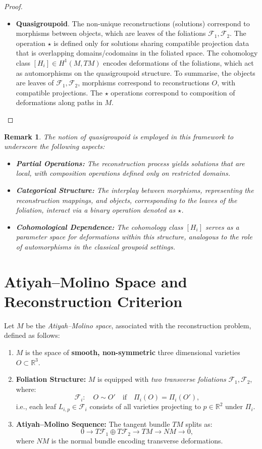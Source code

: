 \documentclass[runningheads]{llncs}
\newtheorem{rem}{Remark}
\newcommand{\cF}{\mathcal{F}}
\begin{document}
\begin{proof}
\begin{itemize}
\begin{itemize}
\item \textbf{Quasigroupoid}.  The non-unique reconstructions (solutions) correspond to morphisms between objects, which are leaves of the foliations $\cF_1, \cF_2$.
The operation $\star$  is defined only for solutions sharing compatible projection data that is overlapping domains/codomains in the foliated space. The cohomology class $[H_i] \in H^1(M, TM)$ encodes deformations of the foliations, which act as automorphisms on the quasigroupoid structure. To summarise, the objects are leaves of $\cF_1, \cF_2$, morphisms correspond to reconstructions $O$, with compatible projections. The $\star$ operations correspond to composition of deformations along paths in $M$.
\end{itemize}
\end{itemize}
\end{proof}
\begin{rem}
The notion of quasigroupoid is  employed in this framework to underscore the following aspects: 
\begin{itemize}
\item {\bf Partial Operations:} The reconstruction process yields solutions that are  local, with composition operations defined only on restricted domains. 
\item {\bf  Categorical Structure:} The interplay between morphisms, representing the reconstruction mappings, and objects, corresponding to the leaves of the foliation, interact via a binary operation denoted as $\star$.
\item {\bf  Cohomological Dependence:} The cohomology class $[H_i]$ serves as a parameter space for deformations within this structure, analogous to the role of automorphisms in the classical groupoid settings. 
\end{itemize}
\end{rem}

\section{Atiyah--Molino Space and Reconstruction Criterion}
Let \( M \) be the \emph{Atiyah--Molino space}, associated with the reconstruction problem, defined as follows:

\begin{enumerate}
\item \( M \) is the space of {\bf smooth, non-symmetric} three dimensional varieties \( O \subset \mathbb{R}^3 \).
\item {\bf Foliation Structure:}
\( M \) is equipped with {\it two transverse foliations} \( \mathcal{F}_1, \mathcal{F}_2 \), where:
\[
\mathcal{F}_i: \quad O \sim O' \quad \text{if} \quad \Pi_i(O) = \Pi_i(O'),
\]
i.e., each leaf \( L_{i,p} \in \mathcal{F}_i \) consists of all varieties projecting to \( p \in \mathbb{R}^2 \) under \( \Pi_i \).
\item {\bf Atiyah--Molino Sequence:}
The tangent bundle \( TM \) splits as:
\[
0 \to T\mathcal{F}_1 \oplus T\mathcal{F}_2 \to TM \to NM \to 0,
\]
where \( NM \) is the normal bundle encoding transverse deformations.
\end{enumerate}
\end{document}

